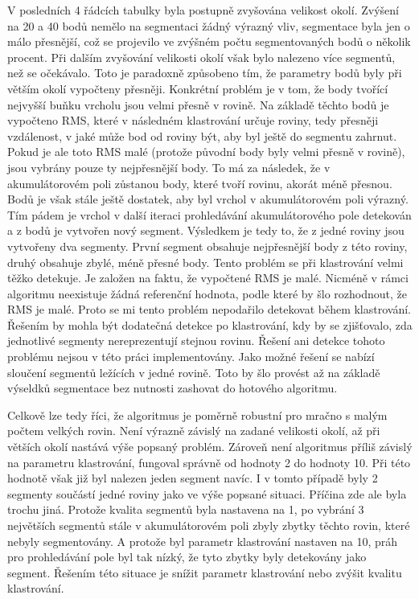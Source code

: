 \documentclass[11pt,twoside,a4paper]{book}
\begin{document}
V posledních 4 řádcích tabulky byla postupně zvyšována velikost okolí. Zvýšení na 20 a 40 bodů nemělo na segmentaci žádný výrazný vliv, segmentace byla jen o málo přesnější, což se projevilo ve zvýšném počtu segmentovaných bodů o několik procent. Při dalším zvyšování velikosti okolí však bylo nalezeno více segmentů, než se očekávalo. Toto je paradoxně způsobeno tím, že parametry bodů byly při větším okolí vypočteny přesněji. Konkrétní problém je v tom, že body tvořící nejvyšší buňku vrcholu jsou velmi přesně v rovině. Na základě těchto bodů je vypočteno RMS, které v následném klastrování určuje  roviny, tedy přesněji vzdálenost, v jaké může bod od roviny být, aby byl ještě do segmentu zahrnut. Pokud je ale toto RMS malé (protože původní body byly  velmi přesně v rovině), jsou vybrány pouze ty nejpřesnější body. To má za následek, že v akumulátorovém poli zůstanou body, které tvoří rovinu, akorát méně přesnou. Bodů je však stále ještě dostatek, aby byl vrchol v akumulátorovém poli výrazný. Tím pádem je vrchol v další iteraci prohledávání akumulátorového pole detekován a z bodů je vytvořen nový segment. Výsledkem je tedy to, že z jedné roviny jsou vytvořeny dva segmenty. První segment obsahuje nejpřesnější body z této roviny, druhý obsahuje zbylé, méně přesné body. Tento problém se při klastrování velmi těžko detekuje. Je založen na faktu, že vypočtené RMS je malé. Nicméně v rámci algoritmu neexistuje žádná referenční hodnota, podle které by šlo rozhodnout, že RMS je malé. Proto se mi tento problém nepodařilo detekovat během klastrování. Řešením by mohla být dodatečná detekce po klastrování, kdy by se zjišťovalo, zda jednotlivé segmenty nereprezentují stejnou rovinu. Řešení ani detekce tohoto problému nejsou v této práci implementovány. Jako možné řešení se nabízí sloučení segmentů ležících v jedné rovině. Toto by šlo provést až na základě výseldků segmentace bez nutnosti zashovat do hotového algoritmu.

Celkově lze tedy říci, že algoritmus je poměrně robustní pro mračno s malým počtem velkých rovin. Není výrazně závislý na zadané velikosti okolí, až při větších okolí nastává výše popsaný problém. Zároveň není algoritmus příliš závislý na parametru klastrování, fungoval správně od hodnoty 2 do hodnoty 10. Při této hodnotě však již byl nalezen jeden segment navíc. I v tomto případě byly 2 segmenty součástí jedné roviny jako ve výše popsané situaci. Příčina zde ale byla trochu jiná. Protože kvalita segmentů byla nastavena na 1, po vybrání 3 největších segmentů stále v akumulátorovém poli zbyly zbytky těchto rovin, které nebyly segmentovány. A protože byl parametr klastrování nastaven na 10, práh pro prohledávání pole byl tak nízký, že tyto zbytky byly detekovány jako segment. Řešením této situace je snížit parametr klastrování nebo zvýšit kvalitu klastrování. 
\end{document}
